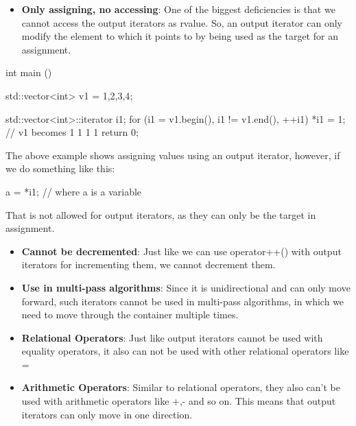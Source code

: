 \documentclass{report}
\begin{document}
\begin{itemize}
  \item \textbf{Only assigning, no accessing}: One of the biggest deficiencies is that we cannot access the output iterators as rvalue. So, an output iterator can only modify the element to which it points to by being used as the target for an assignment.
\end{itemize}
\begin{cppcode}
  int main () {
    std::vector<int> v1 = {1,2,3,4};

    std::vector<int>::iterator i1;
    for (i1 = v1.begin(), i1 != v1.end(), ++i1) {
      *i1 = 1;
    }
    // v1 becomes 1 1 1 1
    return 0;
  } 
\end{cppcode}
\noindent The above example shows assigning values using an output iterator, however, if we do something like this:
\begin{cppcode}
 a = *i1; // where a is a variable
\end{cppcode}
\noindent That is not allowed for output iterators, as they can only be the target in assignment.
\begin{itemize}
  \item \textbf{Cannot be decremented}: Just like we can use operator++() with output iterators for incrementing them, we cannot decrement them.
  \item \textbf{Use in multi-pass algorithms}: Since it is unidirectional and can only move forward, such iterators cannot be used in multi-pass algorithms, in which we need to move through the container multiple times.
  \item \textbf{Relational Operators}: Just like output iterators cannot be used with equality operators, it also can not be used with other relational operators like =
  \item \textbf{Arithmetic Operators}: Similar to relational operators, they also can't be used with arithmetic operators like +,- and so on. This means that output iterators can only move in one direction.
\end{itemize}
\end{document}
